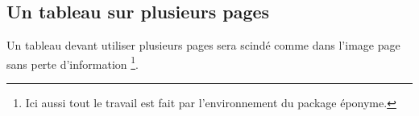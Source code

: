 \documentclass[12pt,a4paper]{article}
\begin{document}


\subsection{Un tableau sur plusieurs pages}


Un tableau devant utiliser plusieurs pages sera scindé comme dans l'image page \pageref{tnslog:demotab*-splitted} sans perte d'information
\footnote{
	Ici aussi tout le travail est fait par l'environnement  du package éponyme.
}.

\begin{figure}[hbt!]\label{tnslog:demotab*-splitted}
	\centering
\end{figure}
\end{document}
